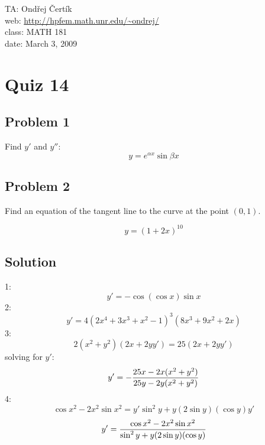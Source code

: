 \documentclass[10pt]{article}
\begin{document}
\noindent TA: Ondřej Čertík\\
web: \url{http://hpfem.math.unr.edu/~ondrej/}\\
class: MATH 181\\
date: March 3, 2009

\section*{Quiz 14}

\subsection*{Problem 1}

Find $y'$ and $y''$:
$$y=e^{\alpha x} \sin \beta x$$

\subsection*{Problem 2}

Find an equation of the tangent line to the curve at the point $(0, 1)$.

$$y=(1+2x)^10$$

\subsection*{Solution}

1:
$$y'=-\cos(\cos x)\sin x$$
2:
$$y'=4(2x^4+3x^3+x^2-1)^3(8x^3+9x^2+2x)$$
3:
$$2(x^2+y^2)(2x+2yy') = 25(2x+2yy')$$
solving for $y'$:
$$y'=-{25x-2x(x^2+y^2)\over25y-2y(x^2+y^2)}$$
4:
$$\cos x^2-2x^2\sin x^2=y'\sin^2 y + y(2\sin y)(\cos y) y'$$
$$y'={\cos x^2-2x^2\sin x^2\over\sin^2 y + y(2\sin y)(\cos y)}$$
\end{document}
